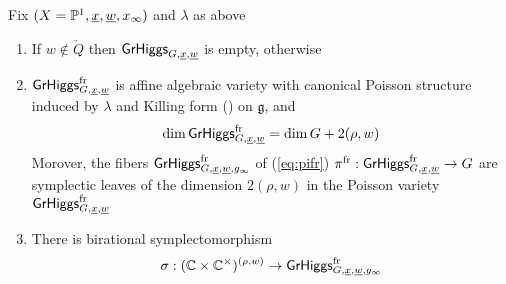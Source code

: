 \documentclass[12pt,psamsfonts,reqno]{amsart}
\begin{document}
\begin{proposition}
Fix $(X = \mathbb P^1, \underline{x}, \underline{w}, x_\infty)$ and $\lambda$ as above
  \begin{enumerate}
  \item If $w \not \in \check Q$ then $ \mathsf{GrHiggs}_{G,\underline{x}, \underline{w}}$ is empty, otherwise
  \item  $ \mathsf{GrHiggs}_{G,\underline{x}, \underline{w}}^{\mathrm{fr}} $ is affine algebraic
    variety with canonical Poisson structure induced by $\lambda$ and Killing form () on $\mathfrak{g}$, and
    \begin{equation}
     \dim \mathsf{GrHiggs}_{G,\underline{x}, \underline{w}}^{\mathrm{fr}}  = \dim G + 2(\rho, w) 
   \end{equation}
   Morover, the fibers $\mathsf{GrHiggs}_{G,\underline{x}, \underline{w}, g_\infty}^{\mathrm{fr}}$
   of  (\ref{eq:pifr}) $\pi^{\mathrm{fr}}: \mathsf{GrHiggs}_{G,\underline{x}, \underline{w}}^{\mathrm{fr}} \to G$ are symplectic leaves of the dimension $2(\rho, w)$ in the Poisson variety $\mathsf{GrHiggs}_{G,\underline{x}, \underline{w}}^{\mathrm{fr}}$
 \item There is birational symplectomorphism
\begin{equation}
 \label{eq:coord}\sigma:   (\mathbb C \times \mathbb C^{\times} )^{(\rho, w)} \to \mathsf{GrHiggs}_{G,\underline{x}, \underline{w}, g_\infty}^{\mathrm{fr}} 
\end{equation}


\end{enumerate}
\end{proposition}
\end{document}
